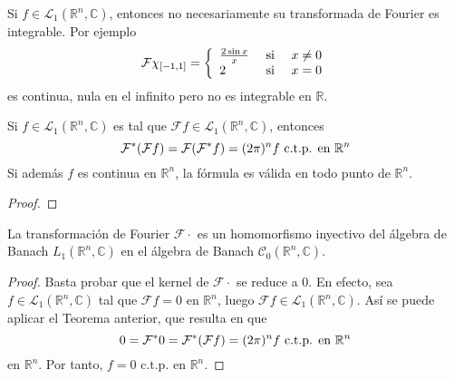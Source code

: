 \documentclass[12pt]{report}
\theoremstyle{largebreak}
\newcommand{\fou}[1]{\ensuremath{\mathcal{F}#1}}
\begin{document}
    \begin{obs}
        Si $f\in\mathcal{L}_1(\mathbb{R}^n,\mathbb{C})$, entonces no necesariamente su transformada de Fourier es integrable. Por ejemplo
        \begin{equation*}
             \fou{\chi_{[-1,1]}}=\left\{
                \begin{array}{lcr}
                    \frac{2\sin x}{x} & \textup{ si } & x\neq0\\
                    2 & \textup{ si } & x=0\\
                \end{array}
             \right.
        \end{equation*}
        es continua, nula en el infinito pero no es integrable en $\mathbb{R}$.
    \end{obs}

    \begin{theor}
        Si $f\in\mathcal{L}_1(\mathbb{R}^n,\mathbb{C})$ es tal que $\fou{f}\in\mathcal{L}_1(\mathbb{R}^n,\mathbb{C})$, entonces
        \begin{equation*}
            \fou^*{(\fou{f})}=\fou{(\fou^*{f})}=(2\pi)^n f\textup{ c.t.p. en }\mathbb{R}^n
        \end{equation*}
        Si además $f$ es continua en $\mathbb{R}^n$, la fórmula es válida en todo punto de $\mathbb{R}^n$.
    \end{theor}

    \begin{proof}
        
    \end{proof}

    \begin{propo}
        La transformación de Fourier $\fou{\cdot}$ es un homomorfismo inyectivo del álgebra de Banach $L_1(\mathbb{R}^n,\mathbb{C})$ en el álgebra de Banach $\mathcal{C}_0(\mathbb{R}^n,\mathbb{C})$.
    \end{propo}

    \begin{proof}
        Basta probar que el kernel de $\fou{\cdot}$ se reduce a $0$. En efecto, sea $f\in\mathcal{L}_1(\mathbb{R}^n,\mathbb{C})$ tal que $\fou{f}=0$ en $\mathbb{R}^n$, luego $\fou{f}\in\mathcal{L}_1(\mathbb{R}^n,\mathbb{C})$. Así se puede aplicar el Teorema anterior, que resulta en que
        \begin{equation*}
            0=\fou^*{0}=\fou^*{(\fou{f})}=(2\pi)^nf\textup{ c.t.p. en }\mathbb{R}^n
        \end{equation*}
        en $\mathbb{R}^n$. Por tanto, $f=0$ c.t.p. en $\mathbb{R}^n$.
    \end{proof}
\end{document}
